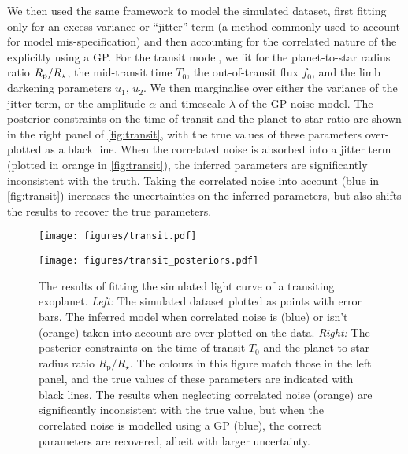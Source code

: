 \documentclass[letterpaper]{ar-1col}
\newcommand{\amplitude}{\ensuremath{\alpha}}
\newcommand{\lengthscale}{\ensuremath{\lambda}}
\begin{document}
We then used the same framework to model the simulated dataset, first fitting only for an excess variance or ``jitter'' term (a method commonly used to account for model mis-specification) and then accounting for the correlated nature of the explicitly using a GP.
For the transit model, we fit for the planet-to-star radius ratio $R_{\rm p}/R_\star$, the mid-transit time $T_0$, the out-of-transit flux $f_0$, and the limb darkening parameters $u_1,\,u_2$.
We then marginalise over either the variance of the jitter term, or the amplitude $\amplitude$ and timescale $\lengthscale$ of the GP noise model.
The posterior constraints on the time of transit and the planet-to-star ratio are shown in the right panel of \autoref{fig:transit}, with the true values of these parameters over-plotted as a black line.
When the correlated noise is absorbed into a jitter term (plotted in orange in \autoref{fig:transit}), the inferred parameters are significantly inconsistent with the truth.
Taking the correlated noise into account (blue in \autoref{fig:transit}) increases the uncertainties on the inferred parameters, but also shifts the results to recover the true parameters.


\begin{figure}[ht]
  \centering
  \begin{minipage}[t]{0.5\linewidth}
    \texttt{[image: figures/transit.pdf]}
  \end{minipage} \hfill
  \begin{minipage}[t]{0.44\linewidth}
    \texttt{[image: figures/transit\_posteriors.pdf]}
  \end{minipage}
  \caption{The results of fitting the simulated light curve of a transiting exoplanet.
  \emph{Left:} The simulated dataset plotted as points with error bars.
  The inferred model when correlated noise is (blue) or isn't (orange) taken into account are over-plotted on the data.
  \emph{Right:} The posterior constraints on the time of transit $T_0$ and the planet-to-star radius ratio $R_\mathrm{p}/R_\star$.
  The colours in this figure match those in the left panel, and the true values of these parameters are indicated with black lines.
  The results when neglecting correlated noise (orange) are significantly inconsistent with the true value, but when the correlated noise is modelled using a GP (blue), the correct parameters are recovered, albeit with larger uncertainty.}
  \label{fig:transit}
\end{figure}
\end{document}

